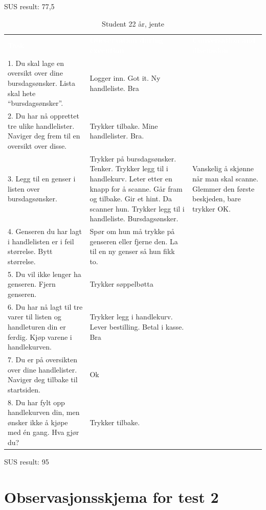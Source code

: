 \noindent SUS result: 77,5

\begin{table}[H]
    \caption{Student 22 år, jente}
    \label{tab:observasjon1_5}
    \centering
    \begin{tabular}{|L{15em}  L{15em} L{15em}|}
    \hline
        \textbf{\textcolor{white}{Task}} & \textbf{\textcolor{white}{Obeservation during execution}} & \textbf{\textcolor{white}{Conversation and discussion}}\\
        1. Du skal lage en oversikt over dine bursdagsønsker. Lista skal hete “bursdagsønsker”. & Logger inn. Got it. Ny handleliste. Bra & \\
        2. Du har nå opprettet tre ulike handlelister. Naviger deg frem til en oversikt over disse. & Trykker tilbake. Mine handlelister. Bra. &  \\
        3. Legg til en genser i listen over bursdagsønsker. & Trykker på bursdagsønsker. Tenker. Trykker legg til i handlekurv. Leter etter en knapp for å scanne. Går fram og tilbake. Gir et hint. Da scanner hun. Trykker legg til i handleliste. Bursdagsønsker. & Vanskelig å skjønne når man skal scanne. Glemmer den første beskjeden, bare trykker OK.\\
        4. Genseren du har lagt i handlelisten er i feil størrelse. Bytt størrelse. & Spør om hun må trykke på genseren eller fjerne den. La til en ny genser så hun fikk to. & \\
        5. Du vil ikke lenger ha genseren. Fjern genseren. & Trykker søppelbøtta & \\
        6. Du har nå lagt til tre varer til listen og handleturen din er ferdig. Kjøp varene i handlekurven. & Trykker legg i handlekurv. Lever bestilling. Betal i kasse. Bra &\\
        7. Du er på oversikten over dine handlelister. Naviger deg tilbake til startsiden. & Ok & \\
        8. Du har fylt opp handlekurven din, men ønsker ikke å kjøpe med én gang. Hva gjør du? & Trykker tilbake. & \\
        \hline
    \end{tabular}
\end{table}

\noindent SUS result: 95

\newpage
\section{\textcolor[HTML]{D32F2F}{Observasjonsskjema for test 2}} \label{App:AppendixC}


